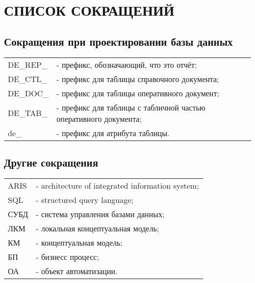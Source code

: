 {}
\section*{СПИСОК СОКРАЩЕНИЙ}

{}
\subsection*{Сокращения при проектировании базы данных}

\begin{tabular}{p{2cm}l}
    DE\_REP\_   & - префикс, обозначающий, что это отчёт; \\
    DE\_CTL\_   & - префикс для таблицы справочного документа; \\
    DE\_DOC\_   & - префикс для таблицы оперативного документ; \\
    DE\_TAB\_   & - префикс для таблицы с табличной частью оперативного документа; \\
    de\_        & - префикс для атрибута таблицы. \\
\end{tabular}

{}
\subsection*{Другие сокращения}

\begin{tabular}{p{2cm}l}
    ARIS    & - architecture of integrated information system;\\
    SQL     & - structured query language;\\
    СУБД    & - система управления базами данных; \\
    ЛКМ     & - локальная концептуальная модель;\\ 
    КМ      & - концептуальная модель;\\
    БП      & - бизнесс процесс;\\
    ОА      & - объект автоматизации.\\
\end{tabular}

\newpage
